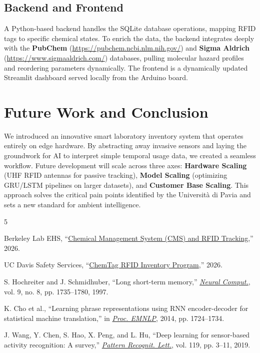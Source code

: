 \documentclass[10pt,twocolumn,letterpaper]{article}
\begin{document}
\subsection{Backend and Frontend}
A Python-based backend handles the SQLite database operations, mapping RFID tags to specific chemical states. To enrich the data, the backend integrates deeply with the \textbf{PubChem} (\url{https://pubchem.ncbi.nlm.nih.gov/}) and \textbf{Sigma Aldrich} (\url{https://www.sigmaaldrich.com/}) databases, pulling molecular hazard profiles and reordering parameters dynamically. The frontend is a dynamically updated Streamlit dashboard served locally from the Arduino board.

\section{Future Work and Conclusion}

We introduced an innovative smart laboratory inventory system that operates entirely on edge hardware. By abstracting away invasive sensors and laying the groundwork for AI to interpret simple temporal usage data, we created a seamless workflow. Future development will scale across three axes: \textbf{Hardware Scaling} (UHF RFID antennas for passive tracking), \textbf{Model Scaling} (optimizing GRU/LSTM pipelines on larger datasets), and \textbf{Customer Base Scaling}. This approach solves the critical pain points identified by the Università di Pavia and sets a new standard for ambient intelligence.

\begin{thebibliography}{5}

Berkeley Lab EHS, ``\href{https://ehs.lbl.gov/service/chemical-lab-safety/rfid-chemical-inventory-tracking/}{Chemical Management System (CMS) and RFID Tracking},'' 2026.

UC Davis Safety Services, ``\href{https://www.healthcareitnews.com/news/future-medication-management-and-digital-visibility-uc-davis-health-using-rfid}{ChemTag RFID Inventory Program},'' 2026.

S. Hochreiter and J. Schmidhuber, ``Long short-term memory,'' \textit{\href{https://www.researchgate.net/publication/13853244_Long_Short-Term_Memory}{Neural Comput.}}, vol. 9, no. 8, pp. 1735--1780, 1997.

K. Cho et al., ``Learning phrase representations using RNN encoder-decoder for statistical machine translation,'' in \textit{\href{https://arxiv.org/abs/1406.1078}{Proc. EMNLP}}, 2014, pp. 1724--1734.

J. Wang, Y. Chen, S. Hao, X. Peng, and L. Hu, ``Deep learning for sensor-based activity recognition: A survey,'' \textit{\href{https://arxiv.org/abs/1707.03502}{Pattern Recognit. Lett.}}, vol. 119, pp. 3--11, 2019.

\end{thebibliography}
\end{document}
